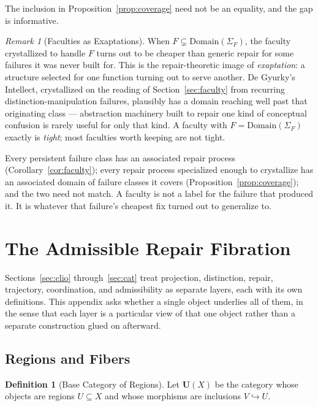 \documentclass[11pt]{article}
\theoremstyle{plain}
\theoremstyle{definition}
\newtheorem{definition}[theorem]{Definition}
\theoremstyle{remark}
\newtheorem{remark}[theorem]{Remark}
\begin{document}
The inclusion in Proposition~\ref{prop:coverage} need not be an equality, and the gap is informative.

\begin{remark}[Faculties as Exaptations]
\label{rem:exapt}
When $F \subsetneq \mathrm{Domain}(\Sigma_F)$, the faculty crystallized to handle $F$ turns out to be cheaper than generic repair for some failures it was never built for. This is the repair-theoretic image of \emph{exaptation}: a structure selected for one function turning out to serve another. De Gyurky's Intellect, crystallized on the reading of Section~\ref{sec:faculty} from recurring distinction-manipulation failures, plausibly has a domain reaching well past that originating class --- abstraction machinery built to repair one kind of conceptual confusion is rarely useful for only that kind. A faculty with $F = \mathrm{Domain}(\Sigma_F)$ exactly is \emph{tight}; most faculties worth keeping are not tight.
\end{remark}

\begin{tcolorbox}[title=Faculty--Repair Duality]
Every persistent failure class has an associated repair process (Corollary~\ref{cor:faculty}); every repair process specialized enough to crystallize has an associated domain of failure classes it covers (Proposition~\ref{prop:coverage}); and the two need not match. A faculty is not a label for the failure that produced it. It is whatever that failure's cheapest fix turned out to generalize to.
\end{tcolorbox}

\section{The Admissible Repair Fibration}
\label{app:fibration}

Sections~\ref{sec:clio} through~\ref{sec:cat} treat projection, distinction, repair, trajectory, coordination, and admissibility as separate layers, each with its own definitions. This appendix asks whether a single object underlies all of them, in the sense that each layer is a particular view of that one object rather than a separate construction glued on afterward.

\subsection{Regions and Fibers}

\begin{definition}[Base Category of Regions]
Let $\mathbf{U}(X)$ be the category whose objects are regions $U \subseteq X$ and whose morphisms are inclusions $V \hookrightarrow U$.
\end{definition}
\end{document}
